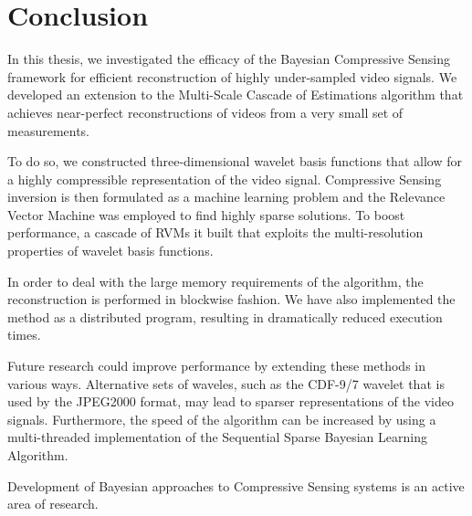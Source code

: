 \chapter{Conclusion}

In this thesis, we investigated the efficacy of the Bayesian Compressive Sensing framework for efficient reconstruction of highly under-sampled video signals.
We developed an extension to the Multi-Scale Cascade of Estimations algorithm that achieves near-perfect reconstructions of videos from a very small set of measurements.

To do so, we constructed three-dimensional wavelet basis functions that allow for a highly compressible representation of the video signal.
Compressive Sensing inversion is then formulated as a machine learning problem and the Relevance Vector Machine was employed to find highly sparse solutions.
To boost performance, a cascade of RVMs it built that exploits the multi-resolution properties of wavelet basis functions.

In order to deal with the large memory requirements of the algorithm, the reconstruction is performed in blockwise fashion.
We have also implemented the method as a distributed program, resulting in dramatically reduced execution times.

Future research could improve performance by extending these methods in various ways.
Alternative sets of waveles, such as the CDF-9/7 wavelet that is used by the JPEG2000 format, may lead to sparser representations of the video signals. 
Furthermore, the speed of the algorithm can be increased by using a multi-threaded implementation of the Sequential Sparse Bayesian Learning Algorithm. 

Development of Bayesian approaches to Compressive Sensing systems is an active area of research.

